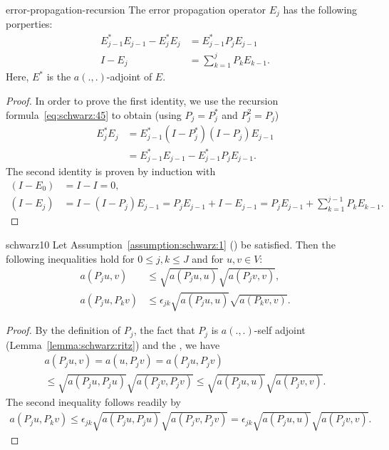 \begin{Lemma}{error-propagation-recursion}
  \label{lemma:schwarz:9}
  The error propagation operator $E_j$ has the following porperties:
  \begin{align}
    \label{eq:schwarz:44}
    E^*_{j-1}E_{j-1} - E^*_{j}E_{j} &= E^*_{j-1} P_j E_{j-1}
    \\
    \label{eq:schwarz:46}
    I - E_j &= \sum_{k=1}^{j} P_k E_{k-1}.
  \end{align}
  Here, $E^*$ is the $a(.,.)$-adjoint of $E$.
\end{Lemma}

\begin{proof}
  In order to prove the first identity, we use the recursion
  formula~\eqref{eq:schwarz:45} to obtain (using $P_j = P_j^*$
  and $P_j^2 = P_j$)
  \begin{align*}
    E^*_{j}E_{j} &= E^*_{j-1} (I-P_j^*) (I-P_j) E_{j-1} \\
    &= E^*_{j-1} E_{j-1} - E^*_{j-1}P_jE_{j-1}.
  \end{align*}
  The second identity is proven by induction with
  \begin{align*}
    (I-E_0) &= I - I = 0, \\
    (I-E_j) &= I-(I-P_j) E_{j-1} = P_j  E_{j-1} + I - E_{j-1} = P_j
    E_{j-1} +\sum_{k=1}^{j-1} P_k E_{k-1}.
  \end{align*}
\end{proof}

\begin{lemma}{schwarz10}
  \label{lemma:schwarz:10}
  Let Assumption~\ref{assumption:schwarz:1} () be satisfied. Then the following
  inequalities hold for $0\le j,k \le J$ and for $u,v\in V$:
  \begin{align}
    a(P_j u,v) &\le \sqrt{a(P_j u,u)} \sqrt{a(P_j v,v)}, \\
    a(P_j u,P_k v) &\le \epsilon_{jk}
    \sqrt{a(P_j u,u)} \sqrt{a(P_k v,v)}.
  \end{align}
\end{lemma}

\begin{proof}
  By the definition of $P_j$, the fact that $P_j$ is $a(.,.)$-self
  adjoint (Lemma~\ref{lemma:schwarz:ritz}) and the , we have
  \begin{multline*}
    a(P_j u,v) = a(u, P_j v) = a(P_j u, P_j v)
    \\
    \le \sqrt{a(P_j u,P_j u)} \sqrt{a(P_j v,P_j v)}
    \le \sqrt{a(P_j u,u)} \sqrt{a(P_j v,v)}.
  \end{multline*}
  The second inequality follows readily by
  \begin{gather*}
    a(P_j u,P_k v)
    \le \epsilon_{jk}\sqrt{a(P_j u,P_j u)} \sqrt{a(P_j v,P_j v)}
    = \epsilon_{jk}\sqrt{a(P_j u,u)} \sqrt{a(P_j v,v)}.
  \end{gather*}
\end{proof}

